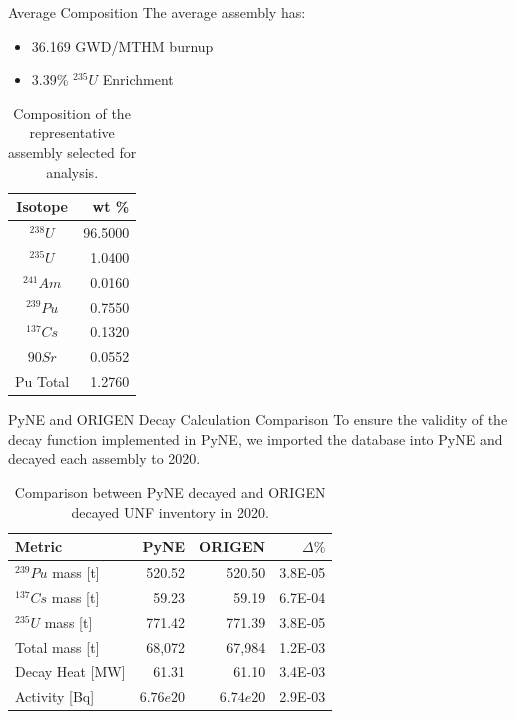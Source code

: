 \documentclass[final]{beamer}
\newlength{\onecolwid}
\newlength{\threecolwid}
\begin{document}
\begin{frame}[t]
\begin{columns}[t,totalwidth=\threecolwid]
\begin{column}{\onecolwid}
\begin{block}{Average Composition}
The average assembly has:
\begin{itemize}
    \item 36.169 GWD/MTHM burnup
    \item 3.39\% $^{235}U$ Enrichment
\end{itemize}

\begin{table}[h]
    \centering
    \begin{tabular}{cr}
        \hline
        Isotope & wt \% \\
        \hline
        $^{238}U$ & 96.5000 \\
        $^{235}U$ & 1.0400 \\
        $^{241}Am$ & 0.0160 \\
        $^{239}Pu$ & 0.7550   \\
        $^{137}Cs$ & 0.1320   \\
        ${90}Sr$ & 0.0552  \\
        Pu Total & 1.2760   \\
        \hline
    \end{tabular}
    \caption{Composition of the representative
             assembly selected for analysis.}
    \label{tab:avg}
\end{table}

\end{block}

\begin{block}{PyNE and ORIGEN Decay Calculation Comparison}
To ensure the validity of the decay function implemented in \gls{PyNE}, 
we imported the database into \gls{PyNE} and decayed each assembly
to 2020.

\begin{table}[h]
    \centering
    \begin{tabular}{l|rr|r}
        \hline
        Metric & PyNE & ORIGEN & $\Delta \%$ \\
        \hline
        $^{239}Pu$ mass [t] & 520.52 & 520.50 & 3.8E-05\\
        $^{137}Cs$ mass [t] & 59.23 & 59.19 & 6.7E-04\\
        $^{235}U$ mass [t] & 771.42 & 771.39 & 3.8E-05\\
        Total mass [t] & 68,072 & 67,984 & 1.2E-03\\
        Decay Heat [MW] & 61.31 & 61.10 & 3.4E-03 \\
        Activity [Bq] & $6.76e20$ & $6.74e20$ & 2.9E-03 \\
        \hline
    \end{tabular}
    \caption{Comparison between \gls{PyNE} decayed and ORIGEN decayed \gls{UNF} inventory in 2020.}
\end{table}
\end{block}



\end{column}
\end{columns}
\end{frame}
\end{document}
